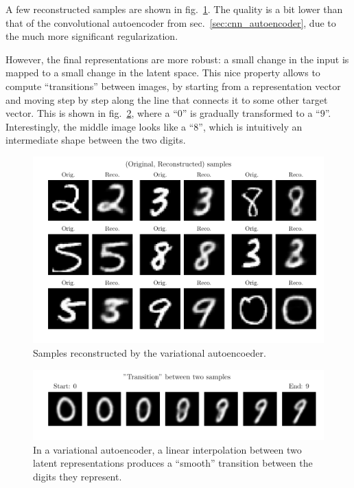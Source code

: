 \documentclass[11pt,a4paper]{scrartcl}
\newcommand{\q}[1]{``#1''}
\begin{document}
A few reconstructed samples are shown in fig.~\ref{fig:samples_vae}. The quality is a bit lower than that of the convolutional autoencoder from sec.~\ref{sec:cnn_autoencoder}, due to the much more significant regularization. 

However, the final representations are more robust: a small change in the input is mapped to a small change in the latent space. This nice property allows to compute \q{transitions} between images, by starting from a representation vector and moving step by step along the line that connects it to some other target vector. This is shown in fig.~\ref{fig:vae_transition}, where a \q{$0$} is gradually transformed to a \q{$9$}. Interestingly, the middle image looks like a \q{$8$}, which is intuitively an intermediate shape between the two digits.


\begin{figure}[htp]
    \centering
    \includegraphics[width=\textwidth]{../Code/Plots/orig_reconstructed_vae}
    \caption{Samples reconstructed by the variational autoencoeder.\label{fig:samples_vae}}
\end{figure}

\begin{figure}[htp]
    \centering
    \includegraphics[width=\textwidth]{../Code/Plots/vae_transition}
    \caption{In a variational autoencoder, a linear interpolation between two latent representations produces a \q{smooth} transition between the digits they represent.\label{fig:vae_transition}}
\end{figure}
\end{document}
